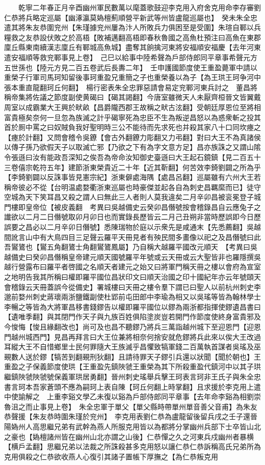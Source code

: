 　　乾寧二年春正月辛酉幽州軍民數萬以麾蓋歌鼓迎李克用入府舍克用命李存審劉仁恭將兵略定巡屬【幽涿瀛莫媯檀薊順營平新武等州皆盧龍巡屬也】　癸未朱全忠遣其將朱友恭圍兖州【朱瑾據兖州屢為汴人所敗兵力俱困至是受圍】朱瑄自鄆以兵糧救之友恭設伏敗之於高梧【敗補邁翻高梧即春秋魯國之高魚杜預注曰高魚在東郡廩丘縣東南續漢志廩丘有鄆城高魚城】盡奪其餉擒河東將安福順安福慶【去年河東遣安福順等救兖鄆事見上卷】　己巳以給事中陸希聲為戶部侍郎同平章事希聲元方五世孫也【陸元方見二百五卷武后長夀二年】　壬申護國節度使王重盈薨軍中請以重榮子行軍司馬珂知留後事珂重盈兄重簡之子也重榮養以為子【為王珙王珂争河中張本重直龍翻珂丘何翻】　楊行密表朱全忠罪惡請會易定兖鄆河東兵討之　董昌將稱帝集將佐議之節度副使黄碣曰【碣其謁翻】今唐室雖微天人未厭齊桓晉文皆翼戴周室以成霸業大王興於畎畝【昌爵隴西郡王故稱之畎古泫翻】受朝廷厚恩位至將相富貴極矣奈何一旦忽為族滅之計乎碣寧死為忠臣不生為叛逆昌怒以為惑衆斬之投其首於厠中罵之曰奴賊負我好聖明時三公不能待而先求死也并殺其家八十口同坎瘞之【瘞於計翻】又問會稽令吳鐐【會古外翻鐐力彫翻又力弔翻】對曰大王不為真諸侯以傳子孫乃欲假天子以取滅亡邪【乃欲之下有為字文意方足】昌亦族誅之又謂山隂令張遜曰汝有能政吾深知之俟吾為帝命汝知御史臺遜曰大王起石鏡鎮【見二百五十三卷僖宗乾符五年】建節浙東榮貴近二十年【近其靳翻】何苦效李錡劉闢之所為乎【李錡劉闢以反誅事皆見憲宗紀】浙東僻處海隅【處昌呂翻】巡屬雖有六州大王若稱帝彼必不從【台明温處婺衢浙東巡屬也時豪傑並起各自為刺史昌羈縻而已】徒守空城為天下笑耳昌又殺之謂人曰無此三人者則人莫我違矣二月辛卯昌被衮冕登子城門樓即皇帝位【被皮義翻　考異曰吳越備史云癸卯昌僭號按會稽錄昌自云應兔子之䜟欲以二月二日僭號取卯月卯日也而實錄長歷皆云二月己丑朔非當時歷誤即今日歷誤要之昌必以二月辛卯日僭號】悉陳瑞物於庭以示衆先是咸通末【先悉薦翻】吳越間訛言山中有大鳥四目三足聲云羅平天冊見者有殃民間多畫像以祀之及昌僭號曰此吾鸑鷟也【鸑五角翻鷟士角翻鸑鷟鳳屬】乃自稱大越羅平國改元順天　【考異曰吳越備史曰癸卯昌僭稱皇帝建元順天國號羅平年號或云天冊或云大聖皆非也羅隱撰吳越行營露布曰羅平者啓國之名順天者建元之始又曰將軍門稱天冊之樓以會府為宣室之地明告我其所稱曰權即羅平國位昌狀印文曰順天治國之印十國紀年亦云年號頤天會稽錄云天冊蓋誤今從備史】署城樓曰天冊之樓令羣下謂已曰聖人以前杭州刺史李邈前婺州刺史蔣瓌兩浙鹽鐵副使杜郢前屯田郎中李瑜為相又以吳瑤等皆為翰林學士李暢之等皆為大將軍昌移書錢鏐告以權即羅平國位以鏐為兩浙都指揮使鏐遺昌書曰【遺唯季翻】與其閉門作天子與九族百姓俱陷塗炭豈若開門作節度使終身富貴邪及今悛悔【悛且緣翻改也】尚可及也昌不聽鏐乃將兵三萬詣越州城下至迎恩門【迎恩門越州城西門】見昌再拜言曰大王位兼將相奈何捨安就危鏐將兵此來以俟大王改過耳縱大王不自惜鄉里士民何罪隨大王族滅乎昌懼致犒軍錢二百萬執首謀者吳瑤及巫覡數人送於鏐【犒苦到翻覡刑狄翻】且請待罪天子鏐引兵還以狀聞【聞於朝也】王重盈之子保義節度使珙【王重盈先鎮陜虢王重榮為其下所殺重盈代鎮河中以其子珙繼鎮陜虢陜虢號保義軍珙居勇翻】晉州刺史瑤舉兵擊王珂表言珂非王氏子與朱全忠書言珂本吾家蒼頭不應為嗣珂上表自陳【珂丘何翻上時掌翻】且求援於李克用上遣中使諭解之　上重李谿文學乙未復以谿為戶部侍郎同平章事【去年命李谿為相劉崇魯沮之而止事見上卷】　朱全忠軍于單父【單父縣時帶單州單音善父音甫】為朱友恭聲援【朱友恭時圍朱瑾於兖州】　李克用表劉仁恭為盧龍留後留兵戌之壬子還晉陽媯州人高思繼兄弟有武幹為燕人所服克用皆以為都將分掌幽州兵部下士卒皆山北之豪也【媯檀諸州皆在幽州山北亦謂之山後】仁恭憚之久之河東兵戍幽州者暴横【横戶孟翻】思繼兄弟以法裁之所誅殺甚多克用怒以讓仁恭仁恭訴稱高氏兄弟所為克用俱殺之仁恭欲收燕人心復引其諸子置帳下厚撫之【為仁恭叛克用